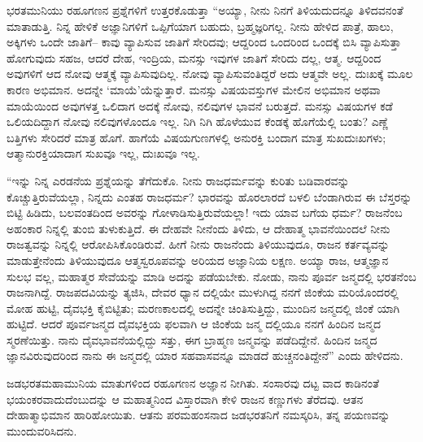 ಭರತಮುನಿಯು ರಹೂಗಣನ ಪ್ರಶ್ನೆಗಳಿಗೆ ಉತ್ತರಕೊಡುತ್ತಾ “ಅಯ್ಯಾ, ನೀನು ನಿನಗೆ ತಿಳಿಯದುದನ್ನೂ ತಿಳಿದವನಂತೆ ಮಾತಾಡುತ್ತಿ. ನಿನ್ನ ಹೇಳಿಕೆ ಅಜ್ಞಾನಿಗಳಿಗೆ ಒಪ್ಪಿಗೆಯಾಗ ಬಹುದು, ಬ್ರಹ್ಮಜ್ಞರಿಗಲ್ಲ. ನೀನು ಹೇಳಿದ ಪಾತ್ರೆ, ಹಾಲು, ಅಕ್ಕಿಗಳು ಒಂದೇ ಜಾತಿಗೆ– ಕಾವು ವ್ಯಾಪಿಸುವ ಜಾತಿಗೆ ಸೇರಿದವು; ಆದ್ದರಿಂದ ಒಂದರಿಂದ ಒಂದಕ್ಕೆ ಬಿಸಿ ವ್ಯಾಪಿಸುತ್ತಾ ಹೋಗುವುದು ಸಹಜ, ಆದರೆ ದೇಹ, ಇಂದ್ರಿಯ, ಮನಸ್ಸು ಇವುಗಳ ಜಾತಿಗೆ ಸೇರಿದು ದಲ್ಲ, ಆತ್ಮ. ಆದ್ದರಿಂದ ಅವುಗಳಿಗೆ ಆದ ನೋವು ಆತ್ಮಕ್ಕೆ ವ್ಯಾಪಿಸುವುದಿಲ್ಲ. ನೋವು ವ್ಯಾಪಿಸುವಂತಿದ್ದರೆ ಅದು ಆತ್ಮವೇ ಅಲ್ಲ. ದುಃಖಕ್ಕೆ ಮೂಲ ಕಾರಣ ಅಭಿಮಾನ. ಅದನ್ನೇ ‘ಮಾಯೆ’ಯೆನ್ನುತ್ತಾರೆ. ಮನಸ್ಸು ವಿಷಯವಸ್ತುಗಳ ಮೇಲಿನ ಅಭಿಮಾನ ಅಥವಾ ಮಾಯೆಯಿಂದ ಅವುಗಳತ್ತ ಒಲಿದಾಗ ಅದಕ್ಕೆ ನೋವು, ನಲಿವುಗಳ ಭಾವನೆ ಬರುತ್ತದೆ. ಮನಸ್ಸು ವಿಷಯಗಳ ಕಡೆ ಒಲಿಯದಿದ್ದಾಗ ನೋವು ನಲಿವುಗಳೊಂದೂ ಇಲ್ಲ. ನಿಗಿ ನಿಗಿ ಹೊಳೆಯುವ ಕೆಂಡಕ್ಕೆ ಹೊಗೆಯೆಲ್ಲಿ ಬಂತು? ಎಣ್ಣೆ ಬತ್ತಿಗಳು ಸೇರಿದರೆ ಮಾತ್ರ ಹೊಗೆ. ಹಾಗೆಯೆ ವಿಷಯಗುಣಗಳಲ್ಲಿ ಅನುರಕ್ತಿ ಬಂದಾಗ ಮಾತ್ರ ಸುಖದುಃಖಗಳು; ಆತ್ಮಾನುರಕ್ತಿಯಾದಾಗ ಸುಖವೂ ಇಲ್ಲ, ದುಃಖವೂ ಇಲ್ಲ.

“ಇನ್ನು ನಿನ್ನ ಎರಡನೆಯ ಪ್ರಶ್ನೆಯನ್ನು ತೆಗೆದುಕೊ. ನೀನು ರಾಜಧರ್ಮವನ್ನು ಕುರಿತು ಬಡಿವಾರವನ್ನು ಕೊಚ್ಚುತ್ತಿರುವೆಯಲ್ಲಾ, ನಿನ್ನದು ಎಂತಹ ರಾಜಧರ್ಮ? ಭಾರವನ್ನು ಹೊರಲಾರದೆ ಬಳಲಿ ಬೆಂಡಾಗಿರುವ ಈ ಬೆಸ್ತರನ್ನು ಬಿಟ್ಟಿ ಹಿಡಿದು, ಬಲವಂತದಿಂದ ಅವರನ್ನು ಗೋಳಾಡಿಸುತ್ತಿರುವೆಯಲ್ಲಾ! ಇದು ಯಾವ ಬಗೆಯ ಧರ್ಮ? ರಾಜನೆಂಬ ಅಹಂಕಾರ ನಿನ್ನಲ್ಲಿ ತುಂಬಿ ತುಳುಕುತ್ತಿದೆ. ಈ ದೇಹವೇ ನೀನೆಂದು ತಿಳಿದು, ಆ ದೇಹಾತ್ಮ ಭಾವನೆಯಿಂದಲೆ ನೀನು ರಾಜತ್ವವನ್ನು ನಿನ್ನಲ್ಲಿ ಆರೋಪಿಸಿಕೊಂಡಿರುವೆ. ಹೀಗೆ ನೀನು ರಾಜನೆಂದು ತಿಳಿಯುವುದೂ, ರಾಜನ ಕರ್ತವ್ಯವನ್ನು ಮಾಡುತ್ತೇನೆಂದು ತಿಳಿಯುವುದೂ ಆತ್ಮಸ್ವರೂಪವನ್ನು ಅರಿಯದ ಅಜ್ಞಾನಿಯ ಲಕ್ಷಣ. ಅಯ್ಯಾ ರಾಜ, ಆತ್ಮಜ್ಞಾನ ಸುಲಭ ವಲ್ಲ, ಮಹಾತ್ಮರ ಸೇವೆಯನ್ನು ಮಾಡಿ ಅದನ್ನು ಪಡೆಯಬೇಕು. ನೋಡು, ನಾನು ಪೂರ್ವ ಜನ್ಮದಲ್ಲಿ ಭರತನೆಂಬ ರಾಜನಾಗಿದ್ದೆ. ರಾಜಪದವಿಯನ್ನು ತ್ಯಜಿಸಿ, ದೇವರ ಧ್ಯಾನ ದಲ್ಲಿಯೇ ಮುಳುಗಿದ್ದ ನನಗೆ ಜಿಂಕೆಯ ಮರಿಯೊಂದರಲ್ಲಿ ಮೋಹ ಹುಟ್ಟಿ, ದೈವಭಕ್ತಿ ಕೈಬಿಟ್ಟಿತು; ಮರಣಕಾಲದಲ್ಲಿ ಅದನ್ನೇ ಚಿಂತಿಸುತ್ತಿದ್ದು, ಮುಂದಿನ ಜನ್ಮದಲ್ಲಿ ಜಿಂಕೆ ಯಾಗಿ ಹುಟ್ಟಿದೆ. ಆದರೆ ಪೂರ್ವಜನ್ಮದ ದೈವಭಕ್ತಿಯ ಫಲವಾಗಿ ಆ ಜಿಂಕೆಯ ಜನ್ಮ ದಲ್ಲಿಯೂ ನನಗೆ ಹಿಂದಿನ ಜನ್ಮದ ಸ್ಮರಣೆಯಿತ್ತು. ನಾನು ದೈವಭಾವನೆಯಲ್ಲಿದ್ದು ಸತ್ತು, ಈಗ ಬ್ರಾಹ್ಮಣ ಜನ್ಮವನ್ನು ಪಡೆದಿದ್ದೇನೆ. ಹಿಂದಿನ ಜನ್ಮದ ಜ್ಞಾನವಿರುವುದರಿಂದ ನಾನು ಈ ಜನ್ಮದಲ್ಲಿ ಯಾರ ಸಹವಾಸವನ್ನೂ ಮಾಡದೆ ಹುಚ್ಚನಂತಿದ್ದೇನೆ” ಎಂದು ಹೇಳಿದನು.

ಜಡಭರತಮಹಾಮುನಿಯ ಮಾತುಗಳಿಂದ ರಹೂಗಣನ ಅಜ್ಞಾನ ನೀಗಿತು. ಸಂಸಾರವು ದಟ್ಟ ವಾದ ಕಾಡಿನಂತೆ ಭಯಂಕರವಾದುದೆಂಬುದನ್ನು ಆ ಮಹಾತ್ಮನಿಂದ ವಿಸ್ತಾರವಾಗಿ ಕೇಳಿ ರಾಜನ ಕಣ್ಣುಗಳು ತೆರೆದವು. ಆತನ ದೇಹಾತ್ಮಾಭಿಮಾನ ಹಾರಿಹೋಯಿತು. ಆತನು ಪರಮಹಂಸನಾದ ಜಡಭರತನಿಗೆ ನಮಸ್ಕರಿಸಿ, ತನ್ನ ಪಯಣವನ್ನು ಮುಂದುವರಿಸಿದನು.

